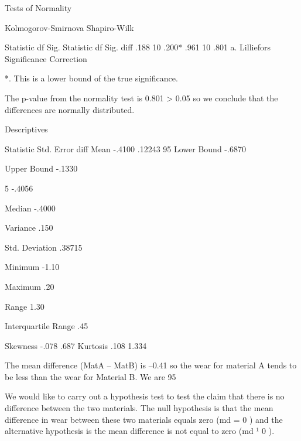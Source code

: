  
Tests of Normality
 	
Kolmogorov-Smirnova
Shapiro-Wilk
 	
Statistic
df
Sig.
Statistic
df
Sig.
diff
.188
10
.200*
.961
10
.801
a. Lilliefors Significance Correction
 	 	 
*. This is a lower bound of the true significance.
 	 
 
 
The p-value from the normality test is 0.801 > 0.05 so we conclude that the differences are normally distributed.
 
 
 
 
 
 
 
 
 
 
 
 
 
 
 
 
 
 
Descriptives
 	 	 	
Statistic
Std. Error
diff
Mean
-.4100
.12243
95%
Lower Bound
-.6870
 
Upper Bound
-.1330
 
5%
-.4056
 
Median
-.4000
 
Variance
.150
 
Std. Deviation
.38715
 
Minimum
-1.10
 
Maximum
.20
 
Range
1.30
 
Interquartile Range
.45
 
Skewness
-.078
.687
Kurtosis
.108
1.334
 
 
The mean difference (MatA – MatB) is –0.41 so the wear for material A tends to be less than the wear for Material B. We are 95%
 
We would like to carry out a hypothesis test to test the claim that there is no difference between the two materials. The null hypothesis is that the mean difference in wear between these two materials equals zero (md = 0 ) and the alternative hypothesis is the mean difference is not equal to zero (md ¹ 0 ).
 
